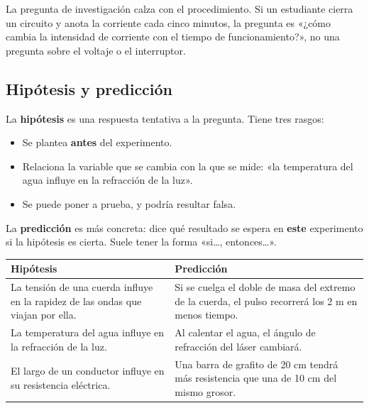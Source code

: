 \begin{clave}[{Recuerda}] La pregunta de investigación calza con el procedimiento. Si un estudiante cierra un circuito y anota la corriente cada cinco minutos, la pregunta es «¿cómo cambia la intensidad de corriente con el tiempo de funcionamiento?», no una pregunta sobre el voltaje o el interruptor.\end{clave}
\subsection{Hipótesis y predicción}
La \textbf{hipótesis} es una respuesta tentativa a la pregunta. Tiene tres rasgos:

 
\begin{itemize}
  \item Se plantea \textbf{antes} del experimento.
  \item Relaciona la variable que se cambia con la que se mide: «la temperatura del agua influye en la refracción de la luz».
  \item Se puede poner a prueba, y podría resultar falsa.
\end{itemize}
 

La \textbf{predicción} es más concreta: dice qué resultado se espera en \textbf{este} experimento si la hipótesis es cierta. Suele tener la forma «si\dots{}, entonces\dots{}».

 
\begin{center}\small
\begin{tabularx}{\linewidth}{@{}>{\raggedright\arraybackslash\hsize=1.00\hsize}X>{\raggedright\arraybackslash\hsize=1.00\hsize}X@{}}
\toprule
\textbf{Hipótesis} & \textbf{Predicción} \\
\midrule
La tensión de una cuerda influye en la rapidez de las ondas que viajan por ella. & Si se cuelga el doble de masa del extremo de la cuerda, el pulso recorrerá los 2 m en menos tiempo. \\
La temperatura del agua influye en la refracción de la luz. & Al calentar el agua, el ángulo de refracción del láser cambiará. \\
El largo de un conductor influye en su resistencia eléctrica. & Una barra de grafito de 20 cm tendrá más resistencia que una de 10 cm del mismo grosor. \\
\bottomrule
\end{tabularx}
\end{center}
  
